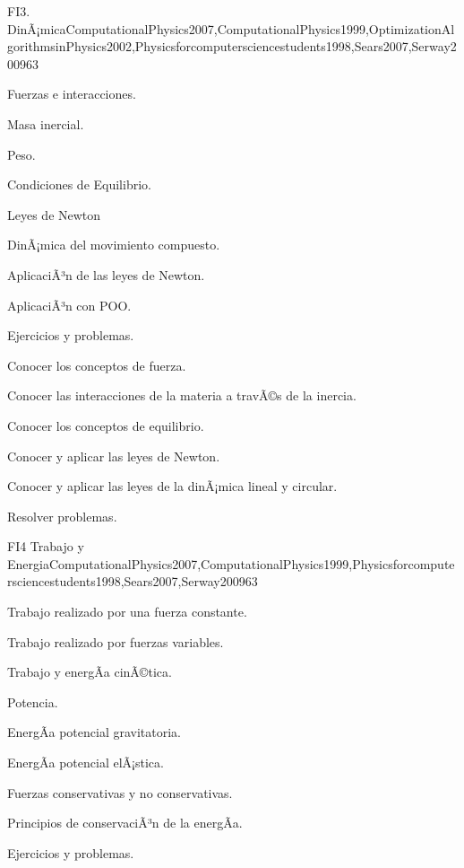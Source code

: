 \begin{syllabus}
\begin{unit}{FI3. DinÃ¡mica}{ComputationalPhysics2007,ComputationalPhysics1999,OptimizationAlgorithmsinPhysics2002,Physicsforcomputersciencestudents1998,Sears2007,Serway2009}{6}{3}
\begin{topics}
      \item Fuerzas e interacciones.
      \item Masa inercial.
      \item Peso.
      \item Condiciones de Equilibrio.
      \item Leyes de Newton
      \item DinÃ¡mica del movimiento compuesto.
      \item AplicaciÃ³n de las leyes de Newton.
      \item AplicaciÃ³n con POO.
      \item Ejercicios y problemas.
   \end{topics}

   \begin{unitgoals}
      \item Conocer los conceptos de fuerza.
      \item Conocer las interacciones de la materia a travÃ©s de la inercia.
      \item Conocer los conceptos de equilibrio.
      \item Conocer y aplicar las leyes de Newton.      
      \item Conocer y aplicar las leyes de la dinÃ¡mica lineal y circular.
      \item Resolver problemas.
   \end{unitgoals}
\end{unit}

\begin{unit}{FI4 Trabajo y Energia}{ComputationalPhysics2007,ComputationalPhysics1999,Physicsforcomputersciencestudents1998,Sears2007,Serway2009}{6}{3}
\begin{topics}
      \item Trabajo realizado por una fuerza constante.
      \item Trabajo realizado por fuerzas variables.
      \item Trabajo y energÃ­a cinÃ©tica.
      \item Potencia.
      \item EnergÃ­a potencial gravitatoria.
      \item EnergÃ­a potencial elÃ¡stica.
      \item Fuerzas conservativas y no conservativas.
      \item Principios de conservaciÃ³n de la energÃ­a.
      \item Ejercicios y problemas.
   \end{topics}


\end{unit}
\end{syllabus}
